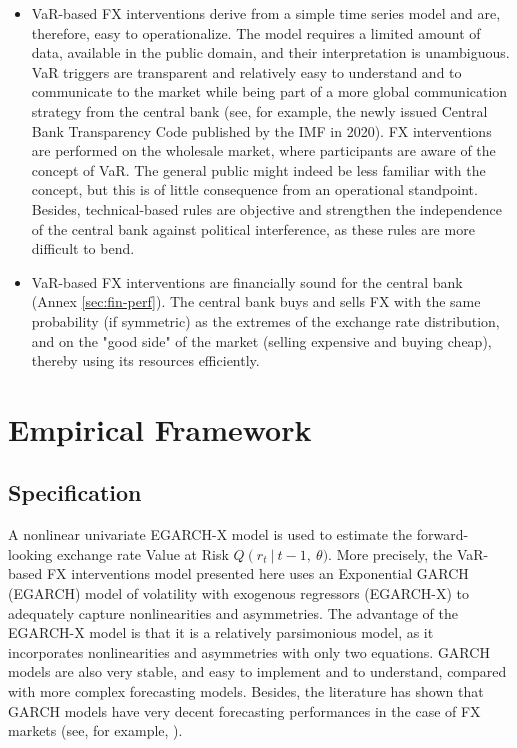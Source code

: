 \documentclass[11pt]{article}
\begin{document}
\begin{itemize}
\item VaR-based  FX interventions derive from  a simple time series  model and
are, therefore, easy to operationalize. The model requires a limited amount of
data,  available   in  the   public  domain,   and  their   interpretation  is
unambiguous. VaR  triggers are transparent  and relatively easy  to understand
and  to  communicate  to  the  market  while  being  part  of  a  more  global
communication  strategy from  the central  bank (see,  for example,  the newly
issued  Central Bank  Transparency Code  published by  the IMF  in 2020).   FX
interventions are  performed on the  wholesale market, where  participants are
aware of the concept of VaR. The  general public might indeed be less familiar
with  the concept,  but  this is  of little  consequence  from an  operational
standpoint. Besides,  technical-based rules  are objective and  strengthen the
independence  of the  central bank  against political  interference, as  these
rules are more difficult to bend.

\item VaR-based  FX interventions are  financially sound for the  central bank
(Annex \ref{sec:fin-perf}).  The central bank  buys and sells  FX with
the  same probability  (if symmetric)  as the  extremes of  the exchange  rate
distribution, and  on the  "good side"  of the  market (selling  expensive and
buying cheap), thereby using its resources efficiently.
\end{itemize}


\section{Empirical Framework}
\label{sec:empirical-framework}

\subsection{Specification}
\label{sec:specification}

A nonlinear univariate EGARCH-X model  is used to estimate the forward-looking
exchange  rate  Value at  Risk  $Q\left(r_t\  \right|\ t-1,\  \theta)$.   More
precisely,  the  VaR-based  FX  interventions model  presented  here  uses  an
Exponential  GARCH  (EGARCH) model  of  volatility  with exogenous  regressors
(EGARCH-X) to adequately capture nonlinearities and asymmetries. The advantage
of the  EGARCH-X model is  that it is a  relatively parsimonious model,  as it
incorporates  nonlinearities and  asymmetries with  only two  equations. GARCH
models are also very stable, and easy to implement and to understand, compared
with more complex  forecasting models. Besides, the literature  has shown that
GARCH  models have  very decent  forecasting performances  in the  case of  FX
markets (see, for example, \cite{mcmillan2012}).\\
\end{document}
